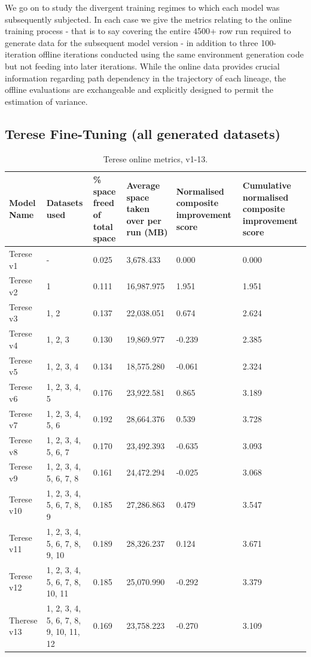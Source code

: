 \documentclass{article}
\begin{document}
We go on to study the divergent training regimes to which each model was subsequently subjected. In each case we give the metrics relating to the online training process - that is to say covering the entire 4500+ row run required to generate data for the subsequent model version - in addition to three 100-iteration offline iterations conducted using the same environment generation code but not feeding into later iterations. While the online data provides crucial information regarding path dependency in the trajectory of each lineage, the offline evaluations are exchangeable and explicitly designed to permit the estimation of variance.

\subsection{Terese Fine-Tuning (all generated datasets)}
\begin{table}[H]
\centering
\setlength{\tabcolsep}{3pt}
\renewcommand{\arraystretch}{1.3}
\footnotesize
\begin{tabularx}{\textwidth}{|L|L|L|L|L|L|}
    \hline
    \textbf{Model Name} & 
    \textbf{Datasets used} & 
    \textbf{\% space freed of total space} & 
    \textbf{Average space taken over per run (MB)} & 
    \textbf{Normalised composite improvement score} & 
    \textbf{Cumulative normalised composite improvement score} \\ 
    \hline
    Terese v1 & - & 0.025 & 3,678.433 & 0.000 & 0.000 \\ 
    \hline
    Terese v2 & 1 & 0.111 & 16,987.975 & 1.951 & 1.951 \\ 
    \hline
    Terese v3 & 1, 2 & 0.137 & 22,038.051 & 0.674 & 2.624 \\ 
    \hline
    Terese v4 & 1, 2, 3 & 0.130 & 19,869.977 & -0.239 & 2.385 \\ 
    \hline
    Terese v5 & 1, 2, 3, 4 & 0.134 & 18,575.280 & -0.061 & 2.324 \\ 
    \hline
    Terese v6 & 1, 2, 3, 4, 5 & 0.176 & 23,922.581 & 0.865 & 3.189 \\ 
    \hline
    Terese v7 & 1, 2, 3, 4, 5, 6 & 0.192 & 28,664.376 & 0.539 & 3.728 \\
    \hline
    Terese v8 & 1, 2, 3, 4, 5, 6, 7 & 0.170 & 23,492.393 & -0.635 & 3.093 \\
    \hline
    Terese v9 & 1, 2, 3, 4, 5, 6, 7, 8 & 0.161 & 24,472.294 & -0.025 & 3.068 \\
    \hline
    Terese v10 & 1, 2, 3, 4, 5, 6, 7, 8, 9 & 0.185 & 27,286.863 & 0.479 & 3.547 \\
    \hline
    Terese v11 & 1, 2, 3, 4, 5, 6, 7, 8, 9, 10 & 0.189 & 28,326.237 & 0.124 & 3.671 \\
    \hline
    Terese v12 & 1, 2, 3, 4, 5, 6, 7, 8, 10, 11 & 0.185 & 25,070.990 & -0.292 & 3.379 \\
    \hline
    Therese v13 & 1, 2, 3, 4, 5, 6, 7, 8, 9, 10, 11, 12 & 0.169 & 23,758.223 & -0.270 & 3.109 \\
    \hline
\end{tabularx}
\caption{Terese online metrics, v1-13.}
\label{tab:terese_online_metrics}
\end{table}
\end{document}
